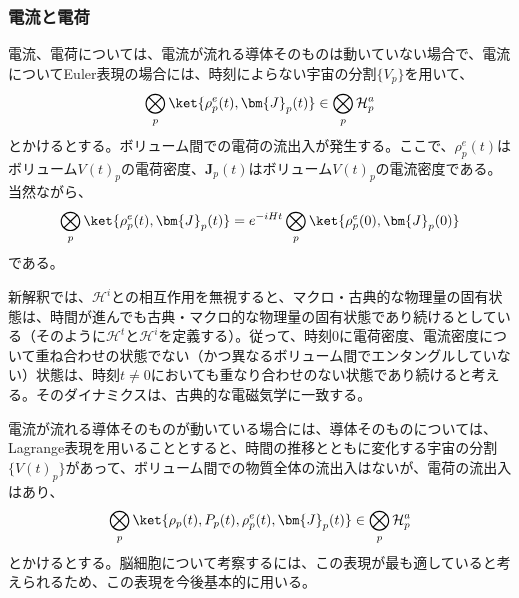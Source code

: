 \subsubsection{電流と電荷}
電流、電荷については、電流が流れる導体そのものは動いていない場合で、電流についてEuler表現の場合には、時刻によらない宇宙の分割$\{V_p\}$を用いて、
\begin{equation}
    \label{eq:electric_current_state_euler}
    \bigotimes_p \ket{\rho^e_p(t),\bm{J}_p(t)} \in \bigotimes_p \mathcal{H}_p^a
\end{equation}
とかけるとする。ボリューム間での電荷の流出入が発生する。ここで、$\rho^e_p(t)$はボリューム$V(t)_p$の電荷密度、$\bm{J}_p(t)$はボリューム$V(t)_p$の電流密度である。
当然ながら、
\begin{equation}
    \bigotimes_p \ket{\rho^e_p(t),\bm{J}_p(t)} = e^{-iHt}\bigotimes_p \ket{\rho_p^e(0),\bm{J}_p(0)}
\end{equation}
である。\par
新解釈では、$\mathcal{H}^i$との相互作用を無視すると、マクロ・古典的な物理量の固有状態は、時間が進んでも古典・マクロ的な物理量の固有状態であり続けるとしている（そのように$\mathcal{H}^t$と$\mathcal{H}^i$を定義する）。従って、時刻$0$に電荷密度、電流密度について重ね合わせの状態でない（かつ異なるボリューム間でエンタングルしていない）状態は、時刻$t \neq 0$においても重なり合わせのない状態であり続けると考える。そのダイナミクスは、古典的な電磁気学に一致する。\par
電流が流れる導体そのものが動いている場合には、導体そのものについては、Lagrange表現を用いることとすると、時間の推移とともに変化する宇宙の分割$\{V(t)_p\}$があって、ボリューム間での物質全体の流出入はないが、電荷の流出入はあり、
\begin{equation}
    \label{eq:electric_current_state_lagrange}
    \bigotimes_p \ket{\rho_p(t),P_p(t),\rho^e_p(t),\bm{J}_p(t)} \in \bigotimes_p \mathcal{H}_p^a
\end{equation}
とかけるとする。脳細胞について考察するには、この表現が最も適していると考えられるため、この表現を今後基本的に用いる。